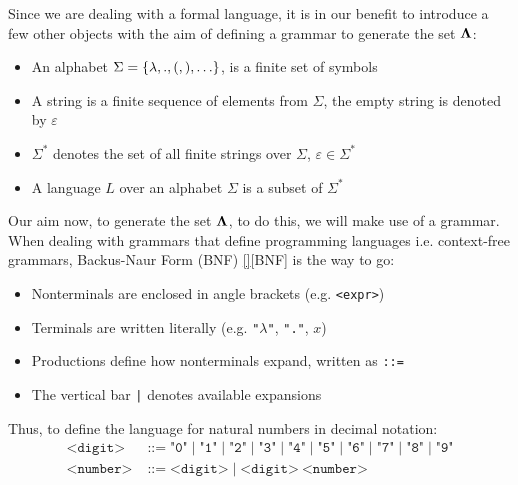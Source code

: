 \documentclass[12pt]{book}
\begin{document}
Since we are dealing with a formal language, it is in our benefit to introduce a few other objects with the aim of defining a grammar to generate the set $\mathbf{\Lambda}$:
\begin{itemize}
\item An alphabet \( \Sigma = \{ \lambda, ., (, ), \ldots \} \), is a finite set of symbols
\item A string is a finite sequence of elements from \( \Sigma \), the empty string is denoted by \( \varepsilon \)
\item \( \Sigma^* \) denotes the set of all finite strings over \( \Sigma \), \( \varepsilon \in \Sigma^* \)
\item A language \( L \) over an alphabet \( \Sigma \) is a subset of \( \Sigma^* \)
\end{itemize}
Our aim now, to generate the set $\mathbf{\Lambda}$,  to do this, we will make use of a grammar. When dealing with grammars that define programming languages i.e. context-free grammars, Backus-Naur Form (BNF) \ref{}[BNF] is the way to go:
\begin{itemize}
\item Nonterminals are enclosed in angle brackets (e.g. \texttt{<expr>})
\item Terminals are written literally (e.g. \texttt{"$\lambda$"}, \texttt{"."}, $x$)
\item Productions define how nonterminals expand, written as \texttt{::=}
\item The vertical bar \texttt{|} denotes available expansions
\end{itemize}
Thus, to define the language for natural numbers in decimal notation:
\begin{align*}
  \texttt{<digit>} &\;\texttt{::=}\; \texttt{"0"} \;\texttt{|}\; \texttt{"1"} \;\texttt{|}\; \texttt{"2"} \;\texttt{|}\; \texttt{"3"} \;\texttt{|}\; \texttt{"4"} \;\texttt{|}\; \texttt{"5"} \;\texttt{|}\; \texttt{"6"} \;\texttt{|}\; \texttt{"7"} \;\texttt{|}\; \texttt{"8"} \;\texttt{|}\; \texttt{"9"} \\
  \texttt{<number>} &\;\texttt{::=}\; \texttt{<digit>} \;|\; \texttt{<digit>} \ \texttt{<number>}
\end{align*}
\end{document}
